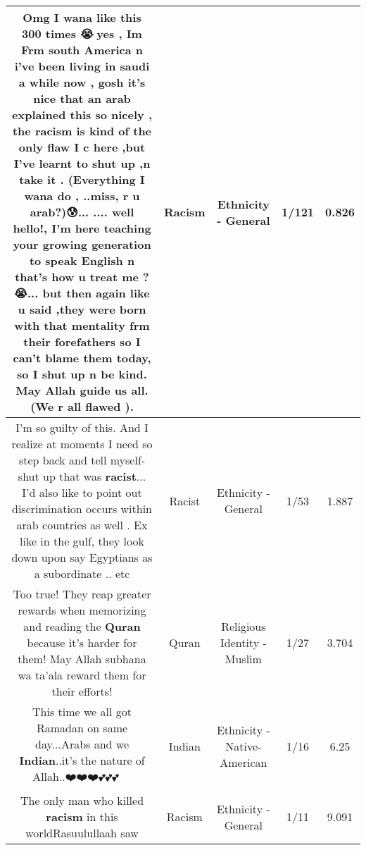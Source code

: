 \documentclass[11pt]{article}
\newlength\mylength
\begin{document}
\begin{center}
\begin{longtable}{|C{.65\mylength}|C{.30\mylength}|C{.12\mylength}|C{.12\mylength}|C{.12\mylength}|}
  \small Omg  I wana like this 300 times 😭💙yes , Im Frm south America n i've been living in saudi  a while now , gosh it's nice that an arab explained this so nicely , the \textbf{racism} is kind of the only flaw I c here ,but I've learnt to shut up ,n take it . (Everything I wana do , ..miss, r u arab?)😰...   .... well hello!, I'm here teaching your growing generation to speak English n that's how u treat me ?😭... but then again like u said ,they were born with that  mentality frm their forefathers so I can't blame them today,  so I shut up n be kind. May Allah guide us all.  (We r all flawed ).\normalsize   & Racism & Ethnicity - General & 1/121 & 0.826 \\  \hline
  \small I'm so guilty of this. And I realize at moments I need so step back and tell myself- shut up that was \textbf{racist}... I'd also like to point out discrimination occurs within arab countries as well . Ex like in the gulf, they look down upon say Egyptians as a subordinate .. etc\normalsize   & Racist & Ethnicity - General & 1/53 & 1.887 \\  \hline
  \small Too true! They reap greater rewards when memorizing and reading the \textbf{Quran} because it's harder for them! May Allah subhana wa ta'ala reward them for their efforts!\normalsize   & Quran & Religious Identity - Muslim & 1/27 & 3.704 \\  \hline
  \small This time we all got Ramadan on same day...Arabs and we \textbf{Indian}..it's the nature of Allah..❤️❤️❤️💕💕💕💞💞💞💞\normalsize   & Indian & Ethnicity - Native-American & 1/16 & 6.25 \\  \hline
  \small The only man who killed \textbf{racism} in this worldRasuulullaah saw\normalsize   & Racism & Ethnicity - General & 1/11 & 9.091 \\  \hline

\end{longtable}
\end{center}
\end{document}
